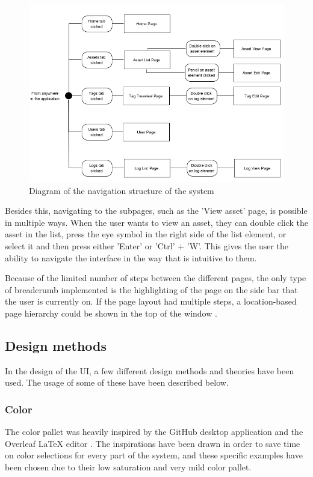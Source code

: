 \begin{figure}[H]
    \centering
    \includegraphics[width=1\textwidth]{figures/UIDesignElements/UI_Design_Structure.png}
    \caption{Diagram of the navigation structure of the system}
    \label{fig:UIStructure}
\end{figure}

Besides this, navigating to the subpages, such as the 'View asset' page, is possible in multiple ways. When the user wants to view an asset, they can double click the asset in the list, press the eye symbol in the right side of the list element, or select it and then press either 'Enter' or 'Ctrl' + 'W'. This gives the user the ability to navigate the interface in the way that is intuitive to them.
\par
Because of the limited number of steps between the different pages, the only type of breadcrumb implemented is the highlighting of the page on the side bar that the user is currently on. If the page layout had multiple steps, a location-based page hierarchy could be shown in the top of the window \citep{Breadcrumbs}.

\subsection{Design methods}
In the design of the UI, a few different design methods and theories have been used. The usage of some of these have been described below.

\subsubsection*{Color}
The color pallet was heavily inspired by the GitHub desktop application and the Overleaf LaTeX editor \citep{GithubDesktop} \citep{Overleaf}. The inspirations have been drawn in order to save time on color selections for every part of the system, and these specific examples have been chosen due to their low saturation and very mild color pallet.

